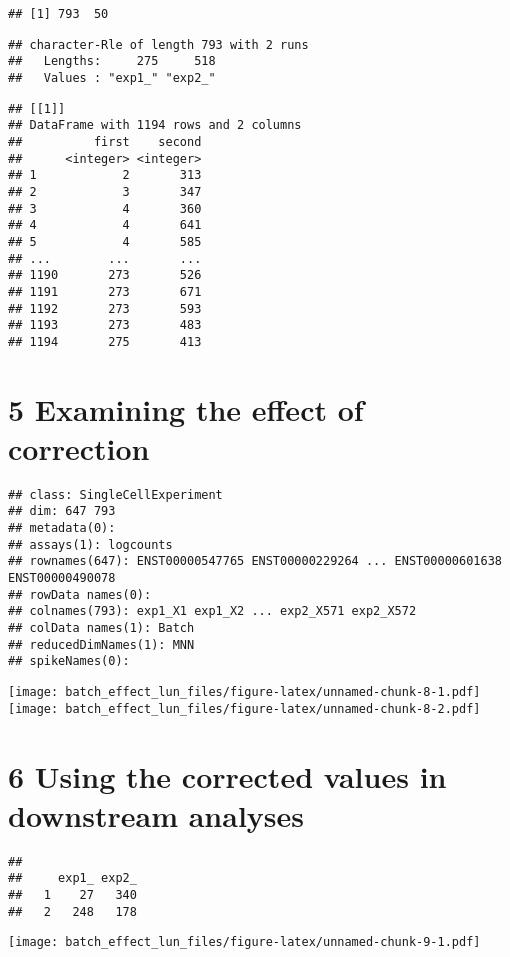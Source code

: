 \documentclass[]{article}
\begin{document}
\begin{verbatim}
## [1] 793  50
\end{verbatim}

\begin{verbatim}
## character-Rle of length 793 with 2 runs
##   Lengths:     275     518
##   Values : "exp1_" "exp2_"
\end{verbatim}

\begin{verbatim}
## [[1]]
## DataFrame with 1194 rows and 2 columns
##          first    second
##      <integer> <integer>
## 1            2       313
## 2            3       347
## 3            4       360
## 4            4       641
## 5            4       585
## ...        ...       ...
## 1190       273       526
## 1191       273       671
## 1192       273       593
## 1193       273       483
## 1194       275       413
\end{verbatim}

\section{5 Examining the effect of
correction}\label{examining-the-effect-of-correction}

\begin{verbatim}
## class: SingleCellExperiment 
## dim: 647 793 
## metadata(0):
## assays(1): logcounts
## rownames(647): ENST00000547765 ENST00000229264 ... ENST00000601638 ENST00000490078
## rowData names(0):
## colnames(793): exp1_X1 exp1_X2 ... exp2_X571 exp2_X572
## colData names(1): Batch
## reducedDimNames(1): MNN
## spikeNames(0):
\end{verbatim}

\texttt{[image: batch\_effect\_lun\_files/figure-latex/unnamed-chunk-8-1.pdf]}
\texttt{[image: batch\_effect\_lun\_files/figure-latex/unnamed-chunk-8-2.pdf]}

\section{6 Using the corrected values in downstream
analyses}\label{using-the-corrected-values-in-downstream-analyses}

\begin{verbatim}
##    
##     exp1_ exp2_
##   1    27   340
##   2   248   178
\end{verbatim}

\texttt{[image: batch\_effect\_lun\_files/figure-latex/unnamed-chunk-9-1.pdf]}
\end{document}
